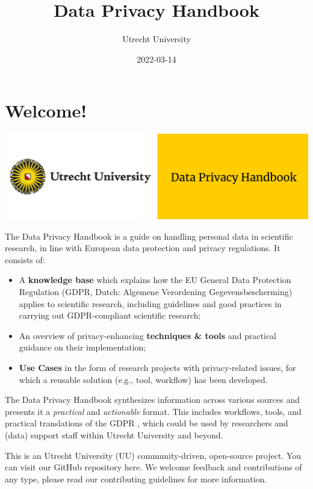 \documentclass[
]{book}
\title{Data Privacy Handbook}
\author{Utrecht University}
\date{2022-03-14}
\providecommand{\tightlist}{%
  \setlength{\itemsep}{0pt}\setlength{\parskip}{0pt}}
\begin{document}
\maketitle

{
\setcounter{tocdepth}{1}
\tableofcontents
}
\hypertarget{welcome}{%
\chapter*{Welcome!}\label{welcome}}

\includegraphics{img/cover-image-dph.png}

The Data Privacy Handbook is a guide on handling personal data in scientific
research, in line with European data protection and privacy regulations. It
consists of:

\begin{itemize}
\tightlist
\item
  A \textbf{knowledge base} which explains how the EU General Data Protection Regulation (GDPR, Dutch: Algemene Verordening Gegevensbescherming) applies to scientific research, including guidelines and good practices in carrying out GDPR-compliant scientific research;
\item
  An overview of privacy-enhancing \textbf{techniques \& tools} and practical guidance on their implementation;
\item
  \textbf{Use Cases} in the form of research projects with privacy-related issues, for which a reusable solution (e.g., tool, workflow) has been developed.
\end{itemize}

The Data Privacy Handbook synthesizes information across various sources and
presents it a \emph{practical} and \emph{actionable} format. This includes workflows,
tools, and practical translations of the GDPR , which could be used by researchers
and (data) support staff within Utrecht University and beyond.

This is an Utrecht University (UU) community-driven, open-source project.
You can visit our GitHub repository here.
We welcome feedback and contributions of any type, please read our
contributing guidelines
for more information.
\end{document}
